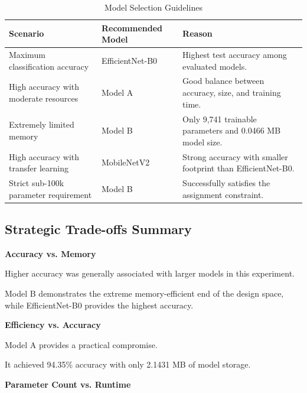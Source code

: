 \documentclass[12pt,a4paper]{report}
\begin{document}
\begin{table}[H]
\centering
\caption{Model Selection Guidelines}
\label{tab:model_selection}

\begin{tabularx}{\textwidth}{p{4cm}p{3.5cm}X}
\toprule
\textbf{Scenario}
&
\textbf{Recommended Model}
&
\textbf{Reason}
\\
\midrule

Maximum classification accuracy
&
EfficientNet-B0
&
Highest test accuracy among evaluated models.
\\

High accuracy with moderate resources
&
Model A
&
Good balance between accuracy, size, and training time.
\\

Extremely limited memory
&
Model B
&
Only 9,741 trainable parameters and 0.0466 MB model size.
\\

High accuracy with transfer learning
&
MobileNetV2
&
Strong accuracy with smaller footprint than EfficientNet-B0.
\\

Strict sub-100k parameter requirement
&
Model B
&
Successfully satisfies the assignment constraint.
\\

\bottomrule
\end{tabularx}

\end{table}

\subsection{Strategic Trade-offs Summary}

\textbf{Accuracy vs. Memory}

Higher accuracy was generally associated with larger models in
this experiment.

Model B demonstrates the extreme memory-efficient end of the
design space, while EfficientNet-B0 provides the highest accuracy.

\textbf{Efficiency vs. Accuracy}

Model A provides a practical compromise.

It achieved 94.35\% accuracy with only 2.1431 MB of model storage.

\textbf{Parameter Count vs. Runtime}
\end{document}
